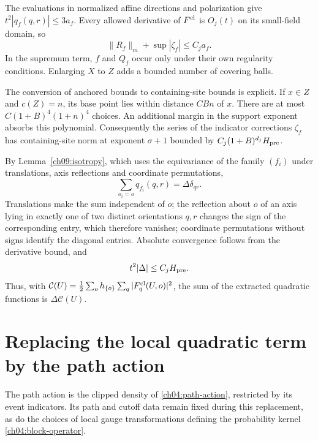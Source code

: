 The evaluations in normalized affine directions and polarization give
$t^2|q_f(q,r)|\le3a_f$. Every allowed derivative of
$F^{\rm cl}$ is $O_j(t)$ on its small-field domain, so
\begin{equation}
 \|R_f\|_m+\sup|\zeta_f|\le C_j a_f .
 \label{ch09:subtraction-bound}
\end{equation}
In the supremum term, $f$ and $Q_f$ occur only under their
own regularity conditions. Enlarging $X$ to $Z$ adds a bounded
number of covering balls.

The conversion of anchored bounds to containing-site bounds
is explicit. If $x\in Z$ and $c(Z)=n$, its base point lies
within distance $CBn$ of $x$. There are at most
$C(1+B)^4(1+n)^4$ choices. An additional margin in the support exponent
absorbs this polynomial. Consequently the series of the indicator corrections $\zeta_f$
has containing-site norm at exponent $\sigma+1$
bounded by $C_j(1+B)^{d_j}H_{\rm pre}$.

By Lemma~\ref{ch09:isotropy}, which uses the equivariance of the family $(f_i)$ under translations, axis reflections and coordinate permutations,
\[
 \sum_{o_i=o}q_{f_i}(q,r)=\Delta\delta_{qr}.
\]
Translations make the sum independent of $o$; the reflection about $o$ of an axis lying in exactly one of two distinct orientations $q,r$ changes the sign of the corresponding entry, which therefore vanishes;
coordinate permutations without signs identify the diagonal entries.
Absolute convergence follows from the derivative bound,
and
\begin{equation}
 t^2|\Delta|\le C_jH_{\rm pre}.
 \label{ch09:delta-bound}
\end{equation}
Thus, with
$\mathcal C(U)=\frac12\sum_o h_{\{o\}}\sum_q|F_q^{\rm cl}(U,o)|^2$,
the sum of the extracted quadratic functions is
$\Delta\mathcal C(U)$.

\section{Replacing the local quadratic term by the path action}
\label{ch09:path-reset}

The path action is the clipped density of \eqref{ch04:path-action}, restricted by its event indicators. Its path and cutoff data remain fixed during this replacement, as do the choices of local gauge transformations defining the probability kernel \eqref{ch04:block-operator}.


